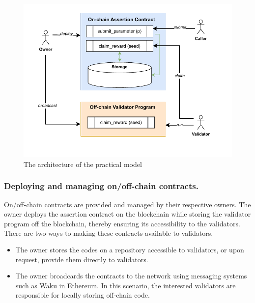 \documentclass[runningheads]{llncs}
\begin{document}
\begin{figure}
\centering
\includegraphics[scale=.8]{assertion}
\caption{The architecture of the practical model}
\label{fig.architect}
\end{figure}

\subsubsection{Deploying and managing on/off-chain contracts.}
On/off-chain contracts are provided and managed by their respective owners.%
The owner deploys the assertion contract on the blockchain while storing the validator program off the blockchain, thereby ensuring its accessibility to the validators. There are two ways to making these contracts available to validators.
\begin{itemize}
\item The owner stores the codes on a repository accessible to validators, or upon request, provide them directly to validators.
\item The owner broadcards the contracts to the network using messaging systems such as Waku in Ethereum. In this scenario, the interested validators are responsible for locally storing off-chain code.
\end{itemize}
\end{document}
